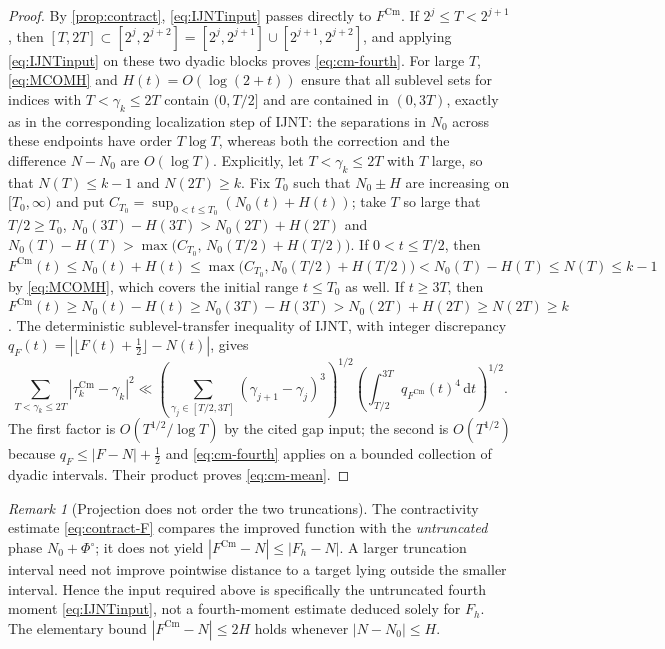 \documentclass[11pt,a4paper]{article}
\numberwithin{equation}{section}
\theoremstyle{definition}
\theoremstyle{remark}
\newtheorem{remark}[theorem]{Remark}
\newcommand{\Cm}{\mathrm{Cm}}
\newcommand{\dd}{\,\mathrm dt}
\begin{document}
\begin{proof}
By \cref{prop:contract}, \eqref{eq:IJNTinput} passes directly to $F^{\Cm}$. If $2^j\le T<2^{j+1}$, then $[T,2T]\subset[2^j,2^{j+2}]=[2^j,2^{j+1}]\cup[2^{j+1},2^{j+2}]$, and applying \eqref{eq:IJNTinput} on these two dyadic blocks proves \eqref{eq:cm-fourth}. For large $T$, \eqref{eq:MCOMH} and $H(t)=O(\log(2+t))$ ensure that all sublevel sets for indices with $T<\gamma_k\le2T$ contain $(0,T/2]$ and are contained in $(0,3T)$, exactly as in the corresponding localization step of IJNT: the separations in $N_0$ across these endpoints have order $T\log T$, whereas both the correction and the difference $N-N_0$ are $O(\log T)$. Explicitly, let $T<\gamma_k\le2T$ with $T$ large, so that $N(T)\le k-1$ and $N(2T)\ge k$. Fix $T_0$ such that $N_0\pm H$ are increasing on $[T_0,\infty)$ and put $C_{T_0}=\sup_{0<t\le T_0}(N_0(t)+H(t))$; take $T$ so large that $T/2\ge T_0$, $N_0(3T)-H(3T)>N_0(2T)+H(2T)$ and $N_0(T)-H(T)>\max\bigl(C_{T_0},\,N_0(T/2)+H(T/2)\bigr)$. If $0<t\le T/2$, then $F^{\Cm}(t)\le N_0(t)+H(t)\le\max\bigl(C_{T_0},N_0(T/2)+H(T/2)\bigr)<N_0(T)-H(T)\le N(T)\le k-1$ by \eqref{eq:MCOMH}, which covers the initial range $t\le T_0$ as well. If $t\ge3T$, then $F^{\Cm}(t)\ge N_0(t)-H(t)\ge N_0(3T)-H(3T)>N_0(2T)+H(2T)\ge N(2T)\ge k$. The deterministic sublevel-transfer inequality of IJNT, with integer discrepancy
$q_F(t)=|\lfloor F(t)+\frac12\rfloor-N(t)|$, gives
\begin{equation}
\sum_{T<\gamma_k\le2T}|\tau_k^{\Cm}-\gamma_k|^2
\ll \left(\sum_{\gamma_j\in[T/2,3T]}(\gamma_{j+1}-\gamma_j)^3\right)^{1/2}
\left(\int_{T/2}^{3T}q_{F^{\Cm}}(t)^4\dd\right)^{1/2}.
\end{equation}
The first factor is $O(T^{1/2}/\log T)$ by the cited gap input; the second is $O(T^{1/2})$ because $q_F\le|F-N|+\frac12$ and \eqref{eq:cm-fourth} applies on a bounded collection of dyadic intervals. Their product proves \eqref{eq:cm-mean}.
\end{proof}

\begin{remark}[Projection does not order the two truncations]
\label{rem:no-h-cm-comparison}
The contractivity estimate \eqref{eq:contract-F} compares the improved function
with the \emph{untruncated} phase $N_0+\Phi^\circ$; it does not yield
$|F^{\Cm}-N|\le |F_h-N|$. A larger truncation interval need not improve
pointwise distance to a target lying outside the smaller interval.
Hence the input required above is specifically the untruncated fourth moment
\eqref{eq:IJNTinput}, not a fourth-moment estimate deduced solely for $F_h$.
The elementary bound $|F^{\Cm}-N|\le 2H$ holds whenever
$|N-N_0|\le H$.
\end{remark}
\end{document}
